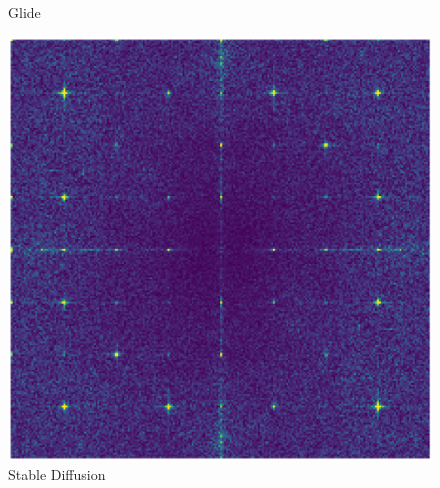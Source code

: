 \documentclass[fleqn,compress,utf8,aspectratio=169,t,handout]{beamer}
\begin{document}
\begin{frame}
\begin{figure}[h]
\begin{minipage}{0.3\textwidth}
      \caption{Glide}
    \end{minipage}
    \hfill
    \pause
		\begin{minipage}{0.3\textwidth}
      \includegraphics[width = 0.9 \textwidth]{figs/resfft_stable_diffusion.png}
      \caption{Stable Diffusion}
    \end{minipage}
	\end{figure}
\end{frame}
\end{document}
